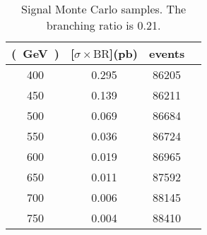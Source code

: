 \begin{table}[htb]
    \centering
    \begin{tabular}{*4c}
        \toprule
        \unit[mass]{(GeV)} & \unit[$\sigma \times \text{BR}$]{(pb)} & events \\
        \midrule
        400 & 0.295 & 86205 \\
        450 & 0.139 & 86211 \\
        500 & 0.069 & 86684 \\
        550 & 0.036 & 86724 \\
        600 & 0.019 & 86965 \\
        650 & 0.011 & 87592 \\
        700 & 0.006 & 88145 \\
        750 & 0.004 & 88410 \\
        \bottomrule
    \end{tabular}
    \caption{Signal Monte Carlo samples. The branching ratio is 0.21.}
    \label{tab:signal_mc}
\end{table}
